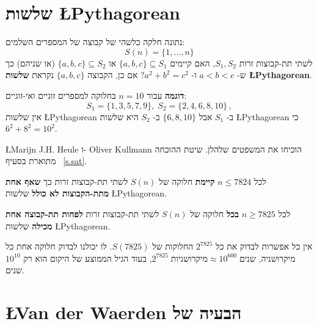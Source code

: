 
\section{שלשות \L{Pythagorean}}\label{s.pyth}

\begin{definition}נתונה חלקה כלשהי של קבוצה של המספרים השלמים:
\[
S(n)=\{1,\ldots,n\}
\]
לשתי תת-קבוצות זרות
$S_1,S_2$,
האם קיימים
$\{a,b,c\}\subseteq S_1$
או
$\{a,b,c\}\subseteq S_2$
(או שניהם) כך ש-%
$a\!<\!b\!<\!c$
ו-%
$a^2+b^2=c^2$?
אם כן, הקבוצה 
$\{a,b,c\}$
נקראת 
\textbf{שלשות \L{Pythagorean}}.
\end{definition}

\textbf{דוגמה}
עבור
$n=10$
בחלוקה למספרים זוגיים ואי-זוגיים:
\[
S_1 = \{1,3,5,7,9\},\; S_2=\{2,4,6,8,10\}\,,
\]
אין שלשות
\L{Pythagorean}
ב-%
$S_1$
אבל  
$\{6,8,10\}$
ב-%
$S_2$
היא
שלשות
\L{Pythagorean}
כי
$6^2+8^2=10^2$.


\L{Marijn J.H. Heule}
ו-%
Oliver Kullmann
הוכיחו את המשפטים שלהלן. שיטת ההוכחה מתוארת בסעיף%
~\ref{s.sat}.

\begin{theorem}
לכל 
$n\leq 7824$
\textbf{קיימת}
חלוקה של 
$S(n)$
לשתי תת-קבוצות זרות כך
\textbf{שאף אחת מתת-הקבוצות לא כולל}
שלשות
\L{Pythagorean}.
\end{theorem}

\begin{theorem}
לכל 
$n\geq 7825$
\textbf{בכל}
חלוקה של 
$S(n)$
לשתי תת-קבוצות זרות 
\textbf{לפחות תת-קבוצה אחת מכילה}
שלשות
\L{Pythagorean}.
\end{theorem}
אין כל אפשרות לבדוק את כל
$2^{7825}$
החלוקות של
$S(7825)$.
לו יכולנו לבדוק חלוקה אחת כל מיקרושניה, 
$2^{7825}\; \textrm{מיקרושניות}\approx 10^{600}\; \textrm{שנים}$, 
בעוד הגיל הממוצע של היקום הוא רק
$10^{10}$
שנים.


\section{\L{Van der Waerden} הבעיה של}\label{s.van}

